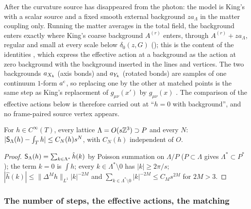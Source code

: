 \begin{remark}\label{rot:rem:CMrg}
After  the curvature source has disappeared from the photon: the model is King's with a scalar source and a fixed smooth external background $za_\Lambda$ in the matter coupling only. Running the matter averages in the total field, the background enters exactly where King's coarse background $A^{(r)}$ enters, through $A^{(r)}+za_\Lambda$, regular and small at every scale below $\delta_0(z,G)$ (); this is the content of the identities \cite[(3.82)--(3.87)]{K1}, which express the effective action at a background as the action at zero background with the background inserted in the lines and vertices. The two backgrounds $a_{X_k}$ (axis bonds) and $a_{Y_k}$ (rotated bonds) are samples of one continuum $1$-form $a^{\rm c}$, so replacing one by the other at matched points is the same step as King's replacement of $g_{\mu\nu}(x')$ by $g_{\mu\nu}(x)$ \cite[p.~665]{K1}. The comparison of the effective actions below is therefore carried out at ``$h=0$ with background'', and no frame-paired source vertex \cite[(3.20)]{K1} appears.
\end{remark}

\begin{lemma}\label{rot:lem:lsum}
For $h\in C^\infty(T)$, every lattice $\Lambda=O(s\mathbb Z^3)\supset P$ and every $N$: $|\mathsf S_\Lambda(h)-\int_Th|\le C_N(h)s^N$, with $C_N(h)$ independent of $O$.
\end{lemma}
\begin{proof}
$\mathsf S_\Lambda(h)=\sum_{k\in\Lambda^*}\hat h(k)$ by Poisson summation on $\Lambda/P$ ($P\subset\Lambda$ gives $\Lambda^*\subset P^*$); the term $k=0$ is $\int h$; every $k\in\Lambda^*\setminus0$ has $|k|\ge2\pi/s$; $|\hat h(k)|\le\|\Delta^Mh\|_{L^1}|k|^{-2M}$ and $\sum_{k\in\Lambda^*\setminus0}|k|^{-2M}\le C_Ms^{2M}$ for $2M>3$.
\end{proof}

\subsubsection*{The number of steps, the effective actions, the matching}

